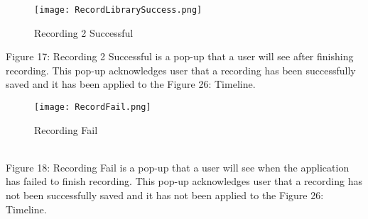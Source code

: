 \documentclass[conference]{IEEEtran}
\begin{document}
\clearpage
\begin{figure}[h]
\centerline{\texttt{[image: RecordLibrarySuccess.png]}}
\caption{Recording 2 Successful}
\label{fig}
\end{figure}
Figure 17: Recording 2 Successful is a pop-up that a user will see after finishing recording. This pop-up acknowledges user that a recording has been successfully saved and it has been applied to the Figure 26: Timeline.
\\
\begin{figure}[h]
\centerline{\texttt{[image: RecordFail.png]}}
\caption{Recording Fail}
\label{fig}
\end{figure}
\\
\indent Figure 18: Recording Fail is a pop-up that a user will see when the application has failed to finish recording. This pop-up acknowledges user that a recording has not been successfully saved and it has not been applied to the Figure 26: Timeline.
\end{document}
